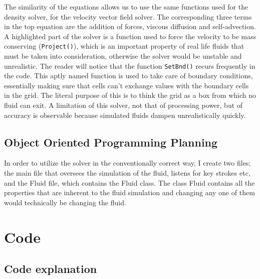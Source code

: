 \documentclass[12pt,a4paper]{book}
\begin{document}
The similarity of the equations allows us to use the same functions used for the density solver, for the velocity vector field solver. The corresponding three terms in the top equation are the addition of forces, viscous diffusion and self-advection. A highlighted part of the solver is a function used to force the velocity to be mass conserving (\verb|Project()|), which is an important property of real life fluids that must be taken into consideration, otherwise the solver would be unstable and unrealistic. The reader will notice that the function \verb|SetBnd()| recurs frequently in the code. This aptly named function is used to take care of boundary conditions, essentially making sure that cells can't exchange values with the boundary cells in the grid. The literal purpose of this is to think the grid as a box from which no fluid can exit. A limitation of this solver, not that of processing power, but of accuracy is observable because simulated fluids dampen unrealistically quickly.

\section{Object Oriented Programming Planning}
In order to utilize the solver in the conventionally correct way, I create two files; the main file that oversees the simulation of the fluid, listens for key strokes etc, and the Fluid file, which contains the Fluid class. The class Fluid contains all the properties that are inherent to the fluid simulation and changing any one of them would technically be changing the fluid.


\chapter{Code}

\section{Code explanation}
\end{document}
